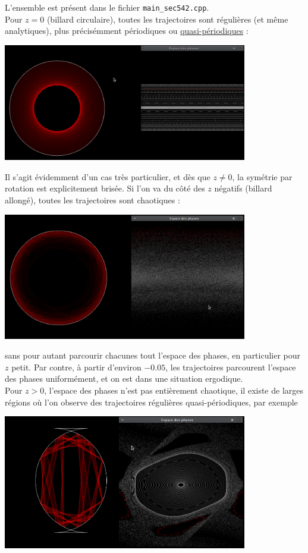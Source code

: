 \documentclass{book}
\def\filename{\texttt}
\begin{document}
\begin{correction}
L'ensemble est présent dans le fichier \filename{main\_sec542.cpp}.\\

Pour $z=0$ (billard circulaire), toutes les trajectoires sont régulières (et même analytiques), plus précisémment périodiques ou \href{https://en.wikipedia.org/wiki/Quasiperiodic_motion}{quasi-périodiques} :
\begin{center}
\includegraphics[width=0.8\textwidth]{TD5bis/trajectoires-esp-phase/traj-at-z=0.png}
\end{center}
Il s'agit évidemment d'un cas très particulier, et dès que $z\neq 0$, la symétrie par rotation est explicitement brisée. Si l'on va du côté des $z$ négatifs (billard allongé), toutes les trajectoires sont chaotiques :
\begin{center}
\includegraphics[width=0.8\textwidth]{TD5bis/trajectoires-esp-phase/traj-chaotique.png}
\end{center}
sans pour autant parcourir chacunes tout l'espace des phases, en particulier pour $z$ petit. Par contre, à partir d'environ $-0.05$, les trajectoires parcourent l'espace des phases uniformément, et on est dans une situation ergodique.\\
Pour $z>0$, l'espace des phases n'est pas entièrement chaotique, il existe de larges régions où l'on observe des trajectoires régulières quasi-périodiques, par exemple
\begin{center}
\includegraphics[width=0.8\textwidth]{TD5bis/trajectoires-esp-phase/traj-régulière-ordre-élevé.png}

\end{center}
\end{correction}
\end{document}
